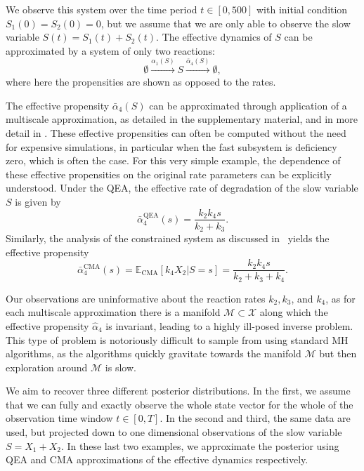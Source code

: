 \documentclass[final]{siamltex}
\newcommand{\edit}[1]{#1}
\begin{document}
We observe this system over the time period $t \in [0,500]$ with
initial condition $S_1(0) = S_2(0) = 0$, but we assume that we are only able to observe
the slow variable $S(t) = S_1(t) + S_2(t)$. 
The effective dynamics of $S$ can be approximated by a system of only
two reactions:
\begin{equation}\label{eqn:QSSA_system}
	\emptyset \xrightarrow{\alpha_1(S)} S \xrightarrow{\bar{\alpha}_4(S)} \emptyset,
\end{equation}
where here the propensities are shown as opposed to the rates.

The effective propensity $\bar{\alpha}_4(S)$ can be  approximated through
application of a multiscale approximation, as detailed in \edit{the
  supplementary material}, and in more detail in \cite{cotter2016constrained}. These effective
propensities can often be computed without the need for expensive
simulations, in particular when the fast subsystem is deficiency zero,
which is often the case\cite{anderson2010product,anderson2016product}. For this very
simple example, the dependence of these effective
propensities on the original rate parameters can be explicitly
understood. Under the QEA,
the effective rate of degradation of the slow variable $S$ is given by
\begin{equation}
	\bar{\alpha}_4^{\text{QEA}}(s) = \frac{k_2k_4s}{k_2+k_3}.
\end{equation}
Similarly, the analysis of the constrained system as discussed in~\cite{cotter2016constrained} yields the effective propensity
\begin{equation}\label{eqn:chem_CMA_rate}
	\bar{\alpha}_4^{\text{CMA}}(s) = \mathbb{E}_{\text{CMA}}\left[k_4X_2|S=s\right] = \frac{k_2k_4s}{k_2+k_3+k_4}.
\end{equation}

Our observations are uninformative about the reaction rates $k_2,
k_3$, and $k_4$, as for each multiscale approximation there
is a manifold $\mathcal{M} \subset \mathcal{X}$ along which the effective propensity
$\hat{\alpha}_4$ is invariant, leading to a highly ill-posed inverse
problem. This type of problem is notoriously difficult to
sample from using standard MH algorithms, as the algorithms quickly
gravitate towards the manifold $\mathcal{M}$ but then
exploration around $\mathcal{M}$ is slow.

We aim to recover three different posterior distributions. In the
first, we assume that we can fully and exactly observe the whole state
vector for the whole of the observation time window $t \in [0,T]$. In
the second and
third, the same data are used, but projected down to one dimensional observations of the slow
variable $S = X_1 + X_2$. In these last two examples, we approximate the
posterior using QEA and CMA approximations of the
effective dynamics respectively.
\end{document}

